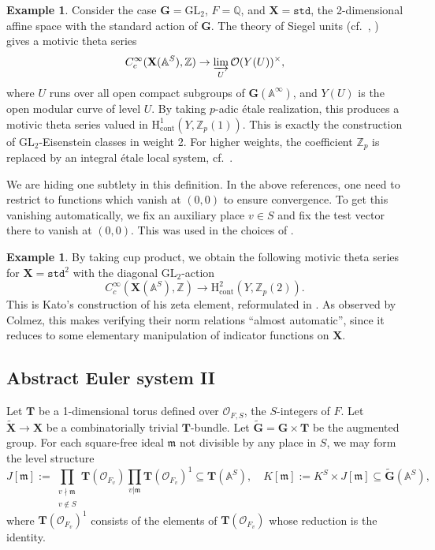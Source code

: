 \documentclass{amsart}
\theoremstyle{definition}
\newtheorem{example}[theorem]{Example}
\theoremstyle{remark}
\newcommand{\1}{\mathbf{1}}
\newcommand{\A}{\mathbb{A}}
\newcommand{\cont}{\mathrm{cont}}
\newcommand{\GL}{\mathrm{GL}}
\newcommand{\h}{\mathrm{H}}
\newcommand{\m}{\mathfrak{m}}
\newcommand{\mb}[1]{\mathbf{#1}}
\newcommand{\Or}{\mathcal{O}}
\newcommand{\Q}{\mathbb{Q}}
\newcommand{\Z}{\mathbb{Z}}
\theoremstyle{definition}
\newcommand{\bG}{\mathbf{G}}
\begin{document}
\begin{example}\label{ex:SiegelUnits}
    Consider the case $\mb{G}=\GL_2$, $F=\Q$, and $\mb{X}=\mathtt{std}$, the 2-dimensional affine space with the standard action of $\mb{G}$. The theory of Siegel units (cf.~\cite[\S 1.4]{KatoEulerSystem}, \cite[Th\'eor\'eme 1.8]{Colmezp-BSD}) gives a motivic theta series 
    \[
        C_c^\infty(\mb{X}(\A^S),\Z)\to\varinjlim_U\Or(Y(U))^\times,
    \]
    where $U$ runs over all open compact subgroups of $\mb{G}(\A^\infty)$, and $Y(U)$ is the open modular curve of level $U$. By taking $p$-adic \'etale realization, this produces a motivic theta series valued in $\h^1_\cont(Y,\Z_p(1))$. This is exactly the construction of $\GL_2$-Eisenstein classes in weight 2. For higher weights, the coefficient $\Z_p$ is replaced by an integral \'etale local system, cf.~\cite[Proposition 7.2.4]{LSZ}.

    We are hiding one subtlety in this definition. In the above references, one need to restrict to functions which vanish at $(0,0)$ to ensure convergence. To get this vanishing automatically, we fix an auxiliary place $v\in S$ and fix the test vector there to vanish at $(0,0)$. This was used in the choices of \cite[\S 8.4.4]{LSZ}. 
\end{example}

\begin{example}
    By taking cup product, we obtain the following motivic theta series for $\mb{X}=\mathtt{std}^2$ with the diagonal $\GL_2$-action
    \[
        C_c^\infty(\mb{X}(\A^S),\Z)\to\h^2_\cont(Y,\Z_p(2)).
    \]
    This is Kato's construction of his zeta element, reformulated in \cite{Colmezp-BSD}. As observed by Colmez, this makes verifying their norm relations ``almost automatic'', since it reduces to some elementary manipulation of indicator functions on $\mb{X}$.
\end{example}

\subsection{Abstract Euler system II}
Let $\mb{T}$ be a 1-dimensional torus defined over $\Or_{F,S}$, the $S$-integers of $F$. Let $\widetilde{\mb{X}}\to\mb{X}$ be a combinatorially trivial $\mb{T}$-bundle. Let $\widetilde{\bG}=\bG\times\mb{T}$ be the augmented group. For each square-free ideal $\m$ not divisible by any place in $S$, we may form the level structure
\begin{equation}\label{eqn:J[m]}
  J[\m]:=\prod_{\substack{v\nmid\m\\v\notin S}}\mb{T}(\Or_{F_v})\prod_{v|\m}\mb{T}(\Or_{F_v})^1\subseteq\mb{T}(\A^S),\quad K[\m]:=K^S\times J[\m]\subseteq\widetilde{\bG}(\A^S),
\end{equation}
where $\mb{T}(\Or_{F_v})^1$ consists of the elements of $\mb{T}(\Or_{F_v})$ whose reduction is the identity.
\end{document}
